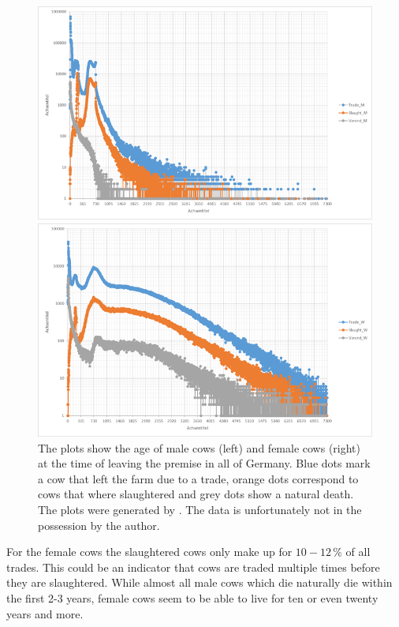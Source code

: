 \begin{figure}[htbp]
\begin{minipage}{0.5\textwidth}
\centering
\noindent\includegraphics[width=0.9\linewidth,height=\textheight,
keepaspectratio]{Alter_Abgang_M.png} 
\end{minipage}
\begin{minipage}{0.5\textwidth}
\centering
\noindent\includegraphics[width=0.9\linewidth,height=\textheight,
keepaspectratio]{Alter_Abgang_W.png} 
\end{minipage}
\caption[Demography Of Cattle In Germany]{The plots show the age of male cows (left) and female cows (right) at the time of leaving the premise in all of Germany. Blue dots mark a cow that left the farm due to a trade, orange dots correspond to cows that where slaughtered and grey dots show a natural death. The plots were generated by \protect\citep{personalCom}. The data is unfortunately not in the possession by the author.}
\label{fig:demographyGermany}
\end{figure} 
For the female cows the slaughtered cows only make up for $10-12\,\%$ of all trades. This could be an indicator that cows are traded multiple times before they are slaughtered. While almost all male cows which die naturally die within the first 2-3 years, female cows seem to be able to live for ten or even twenty years and more. 
